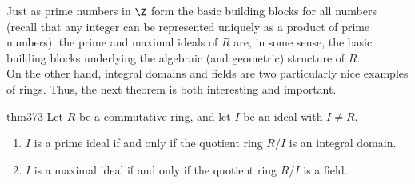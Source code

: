 \documentclass[math1530-lecture-notes]{subfiles}
\begin{document}
Just as prime numbers in $\Z$ form the basic building blocks for all numbers (recall that any
integer can be represented uniquely as a product of prime numbers), the prime and maximal ideals of
$R$ are, in some sense, the basic building blocks underlying the algebraic (and geometric) structure
of $R$.\\

On the other hand, integral domains and fields are two particularly nice examples of rings. Thus,
the next theorem is both interesting and important.
\begin{theorem}[]{thm373}
  Let $R$ be a commutative ring, and let $I$ be an ideal with $I\neq R$.
  \begin{enumerate}
    \item $I$ is a prime ideal if and only if the quotient ring $R / I$ is an integral domain.
    \item $I$ is a maximal ideal if and only if the quotient ring $R / I$ is a field.
  \end{enumerate}
\end{theorem}
\end{document}
